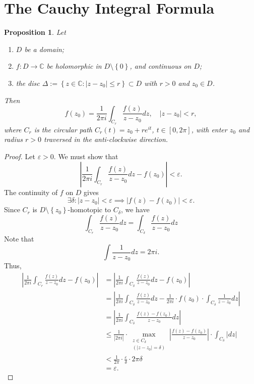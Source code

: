 \documentclass[12pt,openany]{book}
\newtheorem{proposition}[theorem]{Proposition}
\theoremstyle{definition}
\newcommand{\set}[1]{\left\{#1\right\}}
\newcommand{\C}{\mathbb{C}}
\newcommand{\of}[1]{\left( #1 \right)}
\newcommand{\abs}[1]{\left\lvert #1 \right\rvert}
\begin{document}
	\section{The Cauchy Integral Formula}
	\begin{tcolorbox}[colback=white,colframe=procolor,arc=5pt,title={\color{white}\bf }]
		\begin{proposition}
			Let \begin{enumerate}[(1)]
				\item $D$ be a domain;
				\item $f:D\to\C$ be holomorphic in $D\setminus\set{0}$, and continuous on $D$;
				\item the disc $\Delta:=\set{z\in\C:\abs{z-z_0}\leq r}\subset D$ with $r>0$ and $z_0\in D$.
			\end{enumerate} Then \[
			f\of{z_0}=\frac{1}{2\pi i}\int_{C_r}\frac{f\of{z}}{z-z_0}dz,\quad \abs{z-z_0}<r,
			\] where $C_r$ is the circular path $C_r\of{t}=z_0+re^{it}$, $t\in[0,2\pi]$, with enter $z_0$ and radius $r>0$ traversed in the anti-clockwise direction.
		\end{proposition}
	\end{tcolorbox}
	\begin{proof}
		Let $\varepsilon>0$. We must show that \[
		\abs{\frac{1}{2\pi i}\int_{C_r}\frac{f\of{z}}{z-z_0}dz-f\of{z_0}}<\varepsilon.
		\] The continuity of $f$ on $D$ gives \[
		\exists\delta:\abs{z-z_0}<\varepsilon\implies\abs{f\of{z}-f\of{z_0}}<\varepsilon.
		\] Since $C_r$ is $D\setminus\set{z_0}$-homotopic to $C_\delta$, we have \[
		\int_{C_r}\frac{f\of{z}}{z-z_0}dz=\int_{C_\delta}\frac{f\of{z}}{z-z_0}dz
		\] Note that \[
		\int\frac{1}{z-z_0}dz=2\pi i.
		\] Thus, \begin{align*}
		\abs{\frac{1}{2\pi i}\int_{C_r}\frac{f\of{z}}{z-z_0}dz-f\of{z_0}}&=
		\abs{\frac{1}{2\pi i}\int_{C_\delta}\frac{f\of{z}}{z-z_0}dz-f\of{z_0}}\\
		&=\abs{\frac{1}{2\pi i}\int_{C_\delta}\frac{f\of{z}}{z-z_0}dz-\frac{1}{2\pi i}\cdot f\of{z_0}\cdot\int_{C_\delta}\frac{1}{z-z_0}dz}\\
		&=\abs{\frac{1}{2\pi i}\int_{C_\delta}\frac{f\of{z}-f\of{z_0}}{z-z_0}dz}\\
		&\leq\frac{1}{\abs{2\pi i}}\cdot\max_{\substack{z\in C_\delta\\ (\abs{z-z_0}=\delta)}}\abs{\frac{f\of{z}-f\of{z_0}}{z-z_0}}\cdot\int_{C_\delta}\abs{dz}\\
		&<\frac{1}{2\pi}\cdot\frac{\varepsilon}{\delta}\cdot 2\pi\delta\\
		&=\varepsilon.
		\end{align*}
	\end{proof}
	
\end{document}
